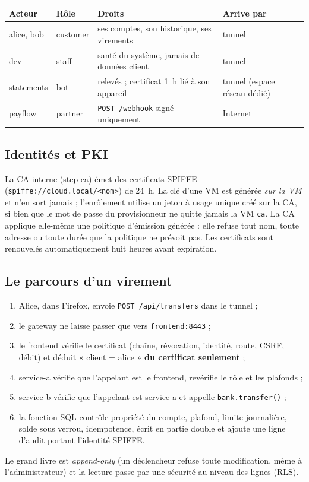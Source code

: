 \documentclass[11pt,a4paper]{article}
\newcommand{\cmd}[1]{\texttt{#1}}
\begin{document}
\begin{center}
\begin{tabularx}{\linewidth}{@{}llL l@{}}
\toprule
\textbf{Acteur} & \textbf{Rôle} & \textbf{Droits} & \textbf{Arrive par}\\
\midrule
alice, bob & customer & ses comptes, son historique, ses virements & tunnel\\
dev & staff & santé du système, jamais de données client & tunnel\\
statements & bot & relevés ; certificat 1~h lié à son appareil & tunnel (espace réseau dédié)\\
payflow & partner & \cmd{POST /webhook} signé uniquement & Internet\\
\bottomrule
\end{tabularx}
\end{center}

\subsection{Identités et PKI}
La CA interne (step-ca) émet des certificats SPIFFE (\cmd{spiffe://cloud.local/<nom>}) de 24~h.
La clé d'une VM est générée \emph{sur la VM} et n'en sort jamais ; l'enrôlement utilise un jeton à
usage unique créé sur la CA, si bien que le mot de passe du provisionneur ne quitte jamais la VM
\cmd{ca}. La CA applique elle-même une politique d'émission générée : elle refuse tout nom, toute
adresse ou toute durée que la politique ne prévoit pas. Les certificats sont renouvelés
automatiquement huit heures avant expiration.

\subsection{Le parcours d'un virement}
\begin{enumerate}
  \item Alice, dans Firefox, envoie \cmd{POST /api/transfers} dans le tunnel ;
  \item le gateway ne laisse passer que vers \cmd{frontend:8443} ;
  \item le frontend vérifie le certificat (chaîne, révocation, identité, route, CSRF, débit) et
        déduit « client = alice » \textbf{du certificat seulement} ;
  \item service-a vérifie que l'appelant est le frontend, revérifie le rôle et les plafonds ;
  \item service-b vérifie que l'appelant est service-a et appelle \cmd{bank.transfer()} ;
  \item la fonction SQL contrôle propriété du compte, plafond, limite journalière, solde sous verrou,
        idempotence, écrit en partie double et ajoute une ligne d'audit portant l'identité SPIFFE.
\end{enumerate}
Le grand livre est \emph{append-only} (un déclencheur refuse toute modification, même à
l'administrateur) et la lecture passe par une sécurité au niveau des lignes (RLS).
\end{document}
